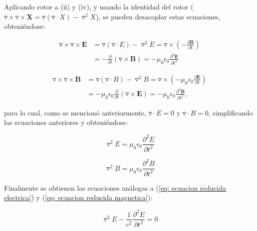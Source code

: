\documentclass[12pt,letterpaper]{article}
\numberwithin{equation}{section}
\begin{document}
Aplicando rotor a (ii) y (iv), y usando la identidad del rotor ($\triangledown\times\triangledown\times\textbf{X}= \triangledown(\triangledown\cdot X)-\triangledown^2X$), se pueden desacoplar estas ecuaciones, obteniéndose:

\begin{equation*}
\begin{split}
\triangledown\times\triangledown\times\textbf{E} &= \triangledown(\triangledown\cdot E)-\triangledown^2E=\triangledown\times\left(-\frac{\partial \textbf{B}}{\partial t}\right)\\
&= -\frac{\partial}{\partial t}(\triangledown\times\textbf{B})=-\mu_0\epsilon_0\frac{\partial^2\textbf{E}}{\partial t^2}
\end{split}
\end{equation*}

\begin{equation*}
\begin{split}
\triangledown\times\triangledown\times\textbf{B} &= \triangledown(\triangledown\cdot B)-\triangledown^2B=\triangledown\times\left(-\mu_0\epsilon_0\frac{\partial \textbf{E}}{\partial t}\right)\\
&= -\mu_0\epsilon_0\frac{\partial}{\partial t}(\triangledown\times\textbf{E})=-\mu_0\epsilon_0\frac{\partial^2\textbf{B}}{\partial t^2},
\end{split}
\end{equation*}

\noindent para lo cual, como se mencionó anteriormente, $\triangledown\cdot E = 0$ y $\triangledown\cdot B = 0$, simplificando las ecuaciones anteriores y obteniéndose:


\begin{equation}
\triangledown^2E = \mu_0\epsilon_0\frac{\partial^2E}{\partial t^2}
\label{eq: ecuacion reducida electrica}
\end{equation}

\begin{equation}
\triangledown^2B = \mu_0\epsilon_0\frac{\partial^2B}{\partial t^2}
\label{eq: ecuacion reducida magnetica}
\end{equation}

\noindent Finalmente se obtienen las ecuaciones análogas a (\ref{eq: ecuacion reducida electrica}) y (\ref{eq: ecuacion reducida magnetica}):


\begin{equation}
\triangledown^2E - \frac{1}{c^2}\frac{\partial^2E}{\partial t^2}= 0
\label{eq: ecuacion onda electrica}
\end{equation}
\end{document}
